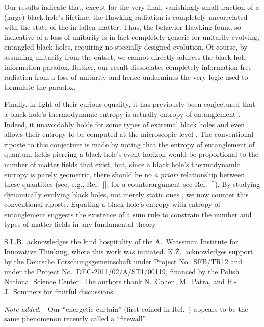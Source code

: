 \documentclass[twocolumn,aps,showpacs,prl]{revtex4}
\begin{document}
Our results indicate that, except for the very final, vanishingly
small fraction of a (large) black hole's lifetime, the Hawking
radiation is completely uncorrelated with the state of the in-fallen
matter. Thus, the behavior Hawking found so indicative of a loss
of unitarity is in fact completely generic for unitarily evolving,
entangled black holes, requiring no specially designed evolution. 
Of course, by assuming unitarity from the outset, we cannot directly
address the black hole information paradox. Rather, our result
dissociates completely information-free radiation from a loss of
unitarity and hence undermines the very logic used to formulate the
paradox. 

Finally, in light of their curious equality, it has previously been 
conjectured that a black hole's thermodynamic entropy is actually 
entropy of entanglement \cite{tHooft85,Hawking01,Brustein06,Emparan06}.
Indeed, it unavoidably holds for some types of extremal black
holes \cite{Hawking01,Brustein06} and even 
allows their entropy to be computed at the microscopic level 
\cite{Emparan06}. The conventional riposte to this conjecture
is made by noting that the entropy of entanglement of quantum fields
piercing a black hole's event horizon would be proportional
to the number of matter fields that exist, but, since a black hole's
thermodynamic entropy is purely geometric, there should be no
{\it a priori\/} relationship between these quantities (see, e.g.,
Ref.~[]; for a counterargument see
Ref.~[]). By studying dynamically evolving black holes,
not merely static ones \cite{tHooft85,Hawking01,Brustein06,Emparan06},
we now counter this conventional riposte. Equating a black hole's
entropy with entropy of entanglement suggests the existence of a sum
rule to constrain the number and types of matter fields in any
fundamental theory.

S.L.B.\ acknowledges the kind hospitality of the A.\ Watssman Institute
for Innovative Thinking, where this work was initiated.  
K.{\.Z}.\ acknowledges support by the Deutsche
Forschungsgemeinschaft under Project No.\ SFB/TR12 and
under the Project No.\  DEC-2011/02/A/ST1/00119,
financed by the Polish National Science Center.
%
The authors thank N.\ Cohen,
M.\ Patra, and H.-J.\ Sommers for fruitful discussions.

%
\vskip 0.1in
{\it Note added}.---Our ``energetic curtain'' (first coined in
Ref.\ \cite{SLB2009}) appears to be the same phenomenon recently
called a ``firewall'' \cite{firewall}.
\end{document}
